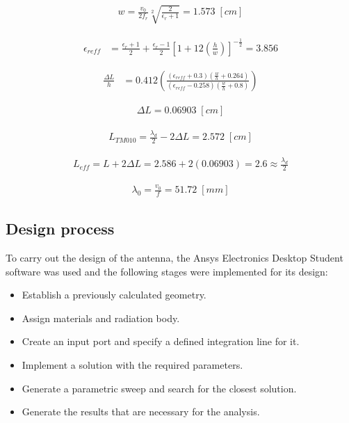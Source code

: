 \documentclass[lettersize,journal]{IEEEtran}
\begin{document}
\begin{align}
\label{eq:des_w}
w =\frac{v_0}{2 f_r} \sqrt[2]{\frac{2}{\epsilon_r+1}}  =1.573 \; [cm]
\end{align}


\begin{align}
    \label{eq:e_eff}
    \epsilon_{reff} &= \frac{\epsilon_r+1}{2}+\frac{\epsilon_r-1}{2}\left[1+12\left(\frac{h}{w}\right)\right]^{-\frac{1}{2}} =3.856
\end{align}

\begin{align}
    \label{eq:delta_L_h}
    \frac{\Delta L}{h} &= 0.412 \left(\frac{\left(\epsilon_{reff}+0.3\right)\left(\frac{w}{h}+0.264\right)}{\left(\epsilon_{reff}-0.258\right)\left(\frac{w}{h}+0.8\right)} \right) 
\end{align}

\begin{align}
    \label{eq:delta_L}
    \Delta L = 0.06903 \; [cm]
\end{align}

\begin{align}
    \label{eq:L_TM}
    L_{TM010}=\frac{\lambda_d}{2}-2 \Delta L   =2.572 \; [cm]
\end{align}

\begin{align}
    \label{eq:L_eff}
    L_{eff}=L+2 \Delta L = 2.586+2\left(0.06903\right)=2.6\approx\frac{\lambda_d}{2}
\end{align}

\begin{align}
    \label{eq:lambda_0}
    \lambda_0=\frac{v_0}{f}=51.72 \; [mm]
\end{align}

\subsection{Design process} 
To carry out the design of the antenna, the Ansys Electronics Desktop Student software was used and the following stages were implemented for its design:

\begin{itemize}
\item Establish a previously calculated geometry.
\item Assign materials and radiation body.
\item Create an input port and specify a defined integration line for it.
\item Implement a solution with the required parameters.
\item Generate a parametric sweep and search for the closest solution.
\item Generate the results that are necessary for the analysis.
\end{itemize}
\end{document}
